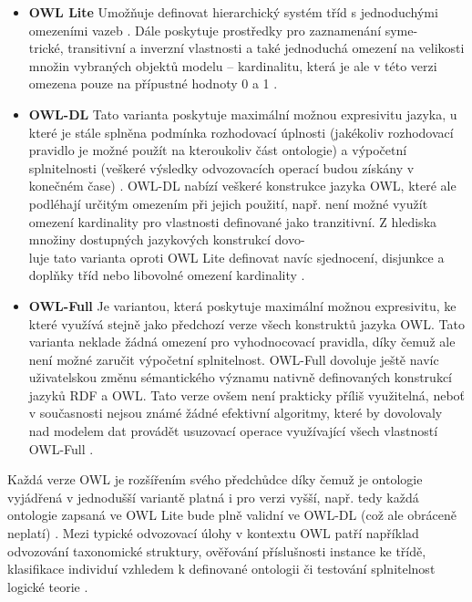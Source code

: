 \documentclass{projekt}
\begin{document}
\begin {itemize}

\item \textbf{OWL Lite} Umožňuje definovat hierarchický systém tříd s jednoduchými omezeními vazeb \cite{_11}. Dále poskytuje prostředky pro zaznamenání syme-\\trické, transitivní a inverzní vlastnosti a také jednoduchá omezení na velikosti množin vybraných objektů modelu – kardinalitu, která je ale v této verzi omezena pouze na přípustné hodnoty 0 a 1 \cite{_2}.
\item \textbf{OWL-DL} Tato varianta poskytuje maximální možnou expresivitu jazyka, u které je stále splněna podmínka rozhodovací úplnosti (jakékoliv rozhodovací pravidlo je možné použít na kteroukoliv část ontologie) a výpočetní splnitelnosti (veškeré výsledky odvozovacích operací budou získány v konečném čase) \cite{_2}. OWL-DL nabízí veškeré konstrukce jazyka OWL, které ale podléhají určitým omezením při jejich použití, např. není možné využít omezení kardinality pro vlastnosti definované jako tranzitivní. Z hlediska množiny dostupných jazykových konstrukcí dovo-\\luje tato varianta oproti OWL Lite definovat navíc sjednocení, disjunkce a doplňky tříd nebo libovolné omezení kardinality \cite{_11}.
\item \textbf{OWL-Full} Je variantou, která poskytuje maximální možnou expresivitu, ke které využívá stejně jako předchozí verze všech konstruktů jazyka OWL. Tato varianta neklade žádná omezení pro vyhodnocovací pravidla, díky čemuž ale není možné zaručit výpočetní splnitelnost. OWL-Full dovoluje ještě navíc uživatelskou změnu sémantického významu nativně definovaných konstrukcí jazyků RDF a OWL. Tato verze ovšem není prakticky příliš využitelná, neboť v současnosti nejsou známé žádné efektivní algoritmy, které by dovolovaly nad modelem dat provádět usuzovací operace využívající všech vlastností OWL-Full \cite{_2}.

\end {itemize}

Každá verze OWL je rozšířením svého předchůdce díky čemuž je ontologie vyjádřená v jednodušší variantě platná i pro verzi vyšší, např. tedy každá ontologie zapsaná ve OWL Lite bude plně validní ve OWL-DL (což ale obráceně neplatí) \cite{_11}.
Mezi typické odvozovací úlohy v kontextu OWL patří například odvozování taxonomické struktury, ověřování příslušnosti instance ke třídě, klasifikace individuí vzhledem k definované ontologii či testování splnitelnost logické teorie \cite{_12}.
\end{document}

